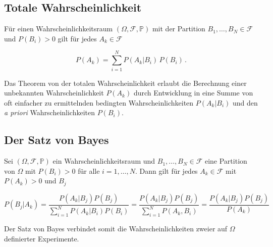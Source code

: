 \subsection{Totale Wahrscheinlichkeit}
\label{sec:totale-wahrscheinlichkeit}

\begin{satz}
Für einen Wahrscheinlichkeitsraum $(\Omega, \mathcal{F}, \mathbb{P})$ mit der Partition $B_1, \ldots, B_N \in \mathcal{F}$ und $P(B_i) > 0$ gilt für jedes $A_k \in \mathcal{F}$

$$
P(A_k) = \sum_{i=1}^{N} P(A_k|B_i)\,P(B_i)\,.
$$
\end{satz}

Das Theorem von der totalen Wahrscheinlichkeit erlaubt die Berechnung einer unbekannten Wahrscheinlichkeit $P(A_k)$ durch Entwicklung in eine Summe von oft einfacher zu ermittelnden bedingten Wahrscheinlichkeiten $P(A_k|B_i)$ und den \textit{a priori} Wahrscheinlichkeiten $P(B_i)$.

\subsection{Der Satz von Bayes}
\label{sec:satz-von-bayes}

\begin{satz}
Sei $(\Omega, \mathcal{F}, \mathbb{P})$ ein Wahrscheinlichkeitsraum und $B_1, \ldots, B_N \in \mathcal{F}$ eine Partition von $\Omega$ mit $P(B_i) > 0$ für alle $i = 1, \ldots, N$. Dann gilt für jedes $A_k \in \mathcal{F}$ mit $P(A_k) > 0$ und $B_j$

$$
P(B_j|A_k) = \frac{P(A_k|B_j)P(B_j)}{\displaystyle\sum_{i=1}^{N} P(A_k|B_i)P(B_i)} = \frac{P(A_k|B_j)P(B_j)}{\displaystyle\sum_{i=1}^{N} P(A_k, B_i)} = \frac{P(A_k|B_j)P(B_j)}{P(A_k)}
$$
\end{satz}

Der Satz von Bayes verbindet somit die Wahrscheinlichkeiten zweier auf $\Omega$ definierter Experimente.

